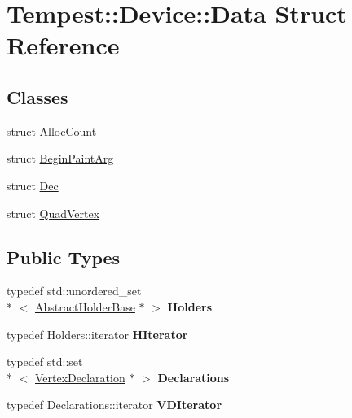 \hypertarget{struct_device_1_1_data}{\section{Tempest\+:\+:Device\+:\+:Data Struct Reference}
\label{struct_device_1_1_data}
}
\subsection*{Classes}
\begin{DoxyCompactItemize}
\item 
struct \hyperlink{struct_device_1_1_data_1_1_alloc_count}{Alloc\+Count}
\item 
struct \hyperlink{struct_device_1_1_data_1_1_begin_paint_arg}{Begin\+Paint\+Arg}
\item 
struct \hyperlink{struct_device_1_1_data_1_1_dec}{Dec}
\item 
struct \hyperlink{struct_device_1_1_data_1_1_quad_vertex}{Quad\+Vertex}
\end{DoxyCompactItemize}
\subsection*{Public Types}
\begin{DoxyCompactItemize}
\item 
\hypertarget{struct_device_1_1_data_a003eff2609adc66b946229162ce8812c}{typedef std\+::unordered\+\_\+set\\*
$<$ \hyperlink{class_tempest_1_1_abstract_holder_base}{Abstract\+Holder\+Base} $\ast$ $>$ {\bfseries Holders}}\label{struct_device_1_1_data_a003eff2609adc66b946229162ce8812c}

\item 
\hypertarget{struct_device_1_1_data_a6e96dd87468a2eebcf843aa5e6fdb7a7}{typedef Holders\+::iterator {\bfseries H\+Iterator}}\label{struct_device_1_1_data_a6e96dd87468a2eebcf843aa5e6fdb7a7}

\item 
\hypertarget{struct_device_1_1_data_af7fcf104f7c33515279dbcb7784c33d8}{typedef std\+::set\\*
$<$ \hyperlink{class_tempest_1_1_vertex_declaration}{Vertex\+Declaration} $\ast$ $>$ {\bfseries Declarations}}\label{struct_device_1_1_data_af7fcf104f7c33515279dbcb7784c33d8}

\item 
\hypertarget{struct_device_1_1_data_a8e72f55d04cc7bfeef27eddf8a6a75e8}{typedef Declarations\+::iterator {\bfseries V\+D\+Iterator}}\label{struct_device_1_1_data_a8e72f55d04cc7bfeef27eddf8a6a75e8}

\end{DoxyCompactItemize}
